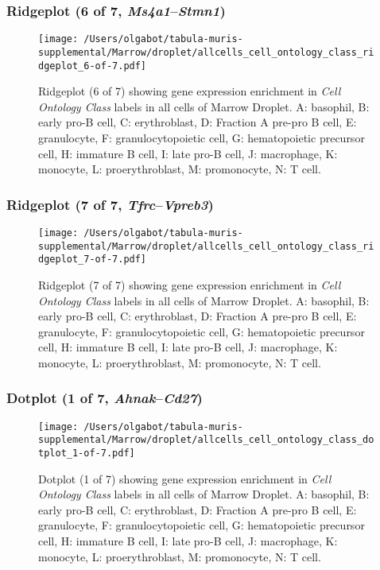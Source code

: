 \clearpage

\subsubsection{Ridgeplot (6 of 7, \emph{Ms4a1}--\emph{Stmn1})}
\begin{figure}[h]
\centering
\texttt{[image: /Users/olgabot/tabula-muris-supplemental/Marrow/droplet/allcells\_cell\_ontology\_class\_ridgeplot\_6-of-7.pdf]}

\caption{ Ridgeplot (6 of 7)  showing gene expression enrichment in \emph{Cell Ontology Class} labels in all cells of Marrow Droplet. A: basophil, B: early pro-B cell, C: erythroblast, D: Fraction A pre-pro B cell, E: granulocyte, F: granulocytopoietic cell, G: hematopoietic precursor cell, H: immature B cell, I: late pro-B cell, J: macrophage, K: monocyte, L: proerythroblast, M: promonocyte, N: T cell.}
\end{figure}


\clearpage

\subsubsection{Ridgeplot (7 of 7, \emph{Tfrc}--\emph{Vpreb3})}
\begin{figure}[h]
\centering
\texttt{[image: /Users/olgabot/tabula-muris-supplemental/Marrow/droplet/allcells\_cell\_ontology\_class\_ridgeplot\_7-of-7.pdf]}

\caption{ Ridgeplot (7 of 7)  showing gene expression enrichment in \emph{Cell Ontology Class} labels in all cells of Marrow Droplet. A: basophil, B: early pro-B cell, C: erythroblast, D: Fraction A pre-pro B cell, E: granulocyte, F: granulocytopoietic cell, G: hematopoietic precursor cell, H: immature B cell, I: late pro-B cell, J: macrophage, K: monocyte, L: proerythroblast, M: promonocyte, N: T cell.}
\end{figure}


\clearpage

\subsubsection{Dotplot (1 of 7, \emph{Ahnak}--\emph{Cd27})}
\begin{figure}[h]
\centering
\texttt{[image: /Users/olgabot/tabula-muris-supplemental/Marrow/droplet/allcells\_cell\_ontology\_class\_dotplot\_1-of-7.pdf]}

\caption{ Dotplot (1 of 7)  showing gene expression enrichment in \emph{Cell Ontology Class} labels in all cells of Marrow Droplet. A: basophil, B: early pro-B cell, C: erythroblast, D: Fraction A pre-pro B cell, E: granulocyte, F: granulocytopoietic cell, G: hematopoietic precursor cell, H: immature B cell, I: late pro-B cell, J: macrophage, K: monocyte, L: proerythroblast, M: promonocyte, N: T cell.}
\end{figure}


